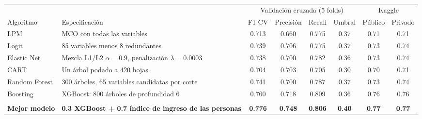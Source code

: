 
\begin{tabular}[t]{llcccccc}
\toprule
\multicolumn{2}{c}{ } & \multicolumn{4}{c}{Validación cruzada (5 folds)} & \multicolumn{2}{c}{Kaggle} \\
\cmidrule(l{3pt}r{3pt}){3-6} \cmidrule(l{3pt}r{3pt}){7-8}
Algoritmo & Especificación & F1 CV & Precisión & Recall & Umbral & Público & Privado\\
\midrule
LPM & MCO con todas las variables & 0.713 & 0.660 & 0.775 & 0.37 & 0.71 & 0.71\\
Logit & 85 variables menos 8 redundantes & 0.739 & 0.706 & 0.775 & 0.37 & 0.73 & 0.74\\
Elastic Net & Mezcla L1/L2 $\alpha = 0.9$, penalización $\lambda = 0.0003$ & 0.738 & 0.700 & 0.782 & 0.36 & 0.73 & 0.74\\
CART & Un árbol podado a 420 hojas & 0.704 & 0.703 & 0.705 & 0.30 & 0.70 & 0.71\\
Random Forest & 300 árboles, 65 variables candidatas por corte & 0.741 & 0.700 & 0.787 & 0.37 & 0.73 & 0.74\\
Boosting & XGBoost: 800 árboles de profundidad 6 & 0.760 & 0.718 & 0.809 & 0.36 & 0.76 & 0.76\\
\midrule\\
\textbf{Mejor modelo} & \textbf{0.3 XGBoost + 0.7 índice de ingreso de las personas} & \textbf{0.776} & \textbf{0.748} & \textbf{0.806} & \textbf{0.40} & \textbf{0.77} & \textbf{0.77}\\
\bottomrule
\end{tabular}
